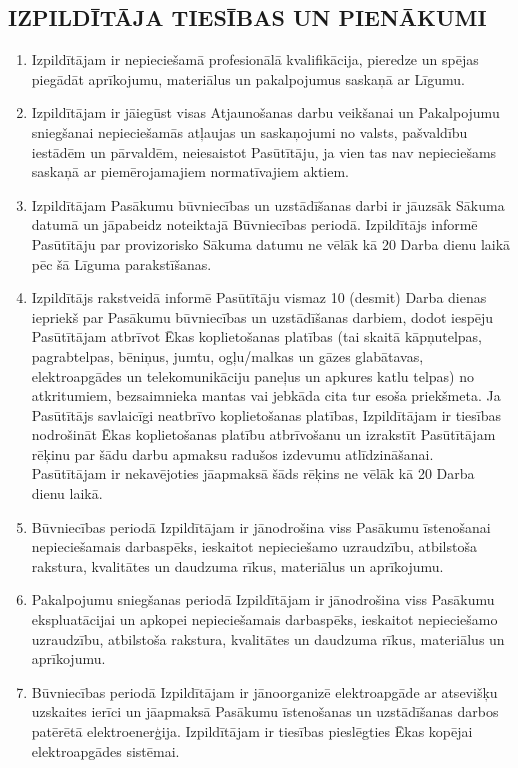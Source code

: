 \begin{multicols}{2}
\subsection{IZPILDĪTĀJA TIESĪBAS UN PIENĀKUMI}
\begin{enumerate}
	\item Izpildītājam ir nepieciešamā profesionālā kvalifikācija, pieredze un spējas piegādāt aprīkojumu, materiālus un pakalpojumus saskaņā ar Līgumu.
	\item Izpildītājam ir jāiegūst visas Atjaunošanas darbu veikšanai un Pakalpojumu sniegšanai nepieciešamās atļaujas un saskaņojumi no valsts, pašvaldību iestādēm un pārvaldēm, neiesaistot Pasūtītāju, ja vien tas nav nepieciešams saskaņā ar piemērojamajiem normatīvajiem aktiem.
	\item Izpildītājam Pasākumu būvniecības un uzstādīšanas darbi ir jāuzsāk Sākuma datumā un jāpabeidz noteiktajā Būvniecības periodā. Izpildītājs informē Pasūtītāju par provizorisko Sākuma datumu ne vēlāk kā 20 Darba dienu laikā pēc šā Līguma parakstīšanas.
	\item Izpildītājs rakstveidā informē Pasūtītāju vismaz 10 (desmit) Darba dienas iepriekš par Pasākumu būvniecības un uzstādīšanas darbiem, dodot iespēju Pasūtītājam atbrīvot Ēkas koplietošanas platības (tai skaitā kāpņutelpas, pagrabtelpas, bēniņus, jumtu, ogļu/malkas un gāzes glabātavas, elektroapgādes un telekomunikāciju paneļus un apkures katlu telpas) no atkritumiem, bezsaimnieka mantas vai jebkāda cita tur esoša priekšmeta. Ja Pasūtītājs savlaicīgi neatbrīvo koplietošanas platības, Izpildītājam ir tiesības nodrošināt Ēkas koplietošanas platību atbrīvošanu un izrakstīt Pasūtītājam rēķinu par šādu darbu apmaksu radušos izdevumu atlīdzināšanai. Pasūtītājam ir nekavējoties jāapmaksā šāds rēķins ne vēlāk kā 20 Darba dienu laikā.
	\item Būvniecības periodā Izpildītājam ir jānodrošina viss Pasākumu īstenošanai nepieciešamais darbaspēks, ieskaitot nepieciešamo uzraudzību, atbilstoša rakstura, kvalitātes un daudzuma rīkus, materiālus un aprīkojumu.
	\item Pakalpojumu sniegšanas periodā Izpildītājam ir jānodrošina viss Pasākumu ekspluatācijai un apkopei nepieciešamais darbaspēks, ieskaitot nepieciešamo uzraudzību, atbilstoša rakstura, kvalitātes un daudzuma rīkus, materiālus un aprīkojumu.
	\item Būvniecības periodā Izpildītājam ir jānoorganizē elektroapgāde ar atsevišķu uzskaites ierīci un jāapmaksā Pasākumu īstenošanas un uzstādīšanas darbos patērētā elektroenerģija. Izpildītājam ir tiesības  pieslēgties Ēkas kopējai elektroapgādes sistēmai.

\end{enumerate}
\end{multicols}
